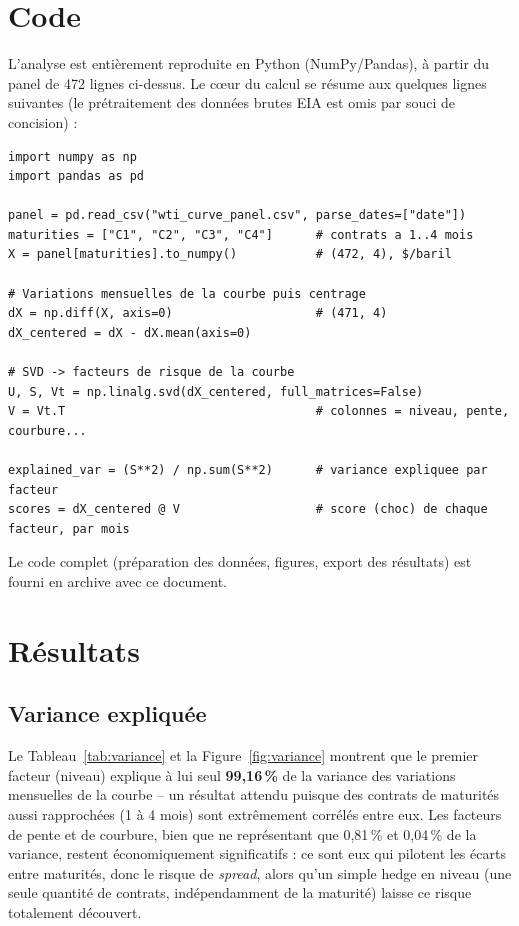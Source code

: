 \documentclass[11pt,a4paper]{article}
\begin{document}
\section{Code}

L'analyse est entièrement reproduite en Python (NumPy/Pandas), à partir du panel de 472 lignes ci-dessus. Le cœur du calcul se résume aux quelques lignes suivantes (le prétraitement des données brutes EIA est omis par souci de concision) :

\begin{lstlisting}[caption={SVD de la matrice des variations de la courbe WTI}, label={lst:svd}]
import numpy as np
import pandas as pd

panel = pd.read_csv("wti_curve_panel.csv", parse_dates=["date"])
maturities = ["C1", "C2", "C3", "C4"]      # contrats a 1..4 mois
X = panel[maturities].to_numpy()           # (472, 4), $/baril

# Variations mensuelles de la courbe puis centrage
dX = np.diff(X, axis=0)                    # (471, 4)
dX_centered = dX - dX.mean(axis=0)

# SVD -> facteurs de risque de la courbe
U, S, Vt = np.linalg.svd(dX_centered, full_matrices=False)
V = Vt.T                                   # colonnes = niveau, pente, courbure...

explained_var = (S**2) / np.sum(S**2)      # variance expliquee par facteur
scores = dX_centered @ V                   # score (choc) de chaque facteur, par mois
\end{lstlisting}

Le code complet (préparation des données, figures, export des résultats) est fourni en archive avec ce document.

\section{Résultats}
\label{sec:resultats}

\subsection{Variance expliquée}

Le Tableau~\ref{tab:variance} et la Figure~\ref{fig:variance} montrent que le premier facteur (niveau) explique à lui seul \textbf{99,16\,\%} de la variance des variations mensuelles de la courbe -- un résultat attendu puisque des contrats de maturités aussi rapprochées (1 à 4 mois) sont extrêmement corrélés entre eux. Les facteurs de pente et de courbure, bien que ne représentant que 0,81\,\% et 0,04\,\% de la variance, restent économiquement significatifs : ce sont eux qui pilotent les écarts entre maturités, donc le risque de \emph{spread}, alors qu'un simple hedge en niveau (une seule quantité de contrats, indépendamment de la maturité) laisse ce risque totalement découvert.
\end{document}
